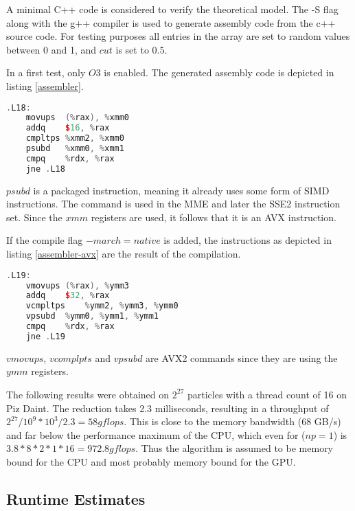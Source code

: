 \documentclass[]{article}
\begin{document}
A minimal C++ code is considered to verify the theoretical model. The -S flag along with the g++ compiler is used to generate assembly code from the c++ source code. For testing purposes all entries in the array are set to random values between 0 and 1, and $cut$ is set to 0.5.

In a first test, only $O3$ is enabled. The generated assembly code is depicted in listing \ref{assembler}.

\begin{lstlisting}[language=c++, caption=Reduction Assembler Code without AVX, label=assembler]
.L18:
	movups	(%rax), %xmm0
	addq	$16, %rax
	cmpltps	%xmm2, %xmm0
	psubd	%xmm0, %xmm1
	cmpq	%rdx, %rax
	jne	.L18

\end{lstlisting}

$psubd$ is a packaged instruction, meaning it already uses some form of SIMD instructions. The command is used in the MME and later the SSE2 instruction set. Since the $xmm$ registers are used, it follows that it is an AVX instruction.

If the compile flag $-march=native$ is added, the instructions as depicted in listing \ref{assembler-avx} are the result of the compilation.

\begin{lstlisting}[language=c++, caption=Reduction Assembler Code with AVX2, label=assembler-avx]
.L19:
	vmovups	(%rax), %ymm3
	addq	$32, %rax
	vcmpltps	%ymm2, %ymm3, %ymm0
	vpsubd	%ymm0, %ymm1, %ymm1
	cmpq	%rdx, %rax
	jne	.L19	

\end{lstlisting}

$vmovups$, $vcomplpts$ and $vpsubd$ are AVX2 commands since they are using the $ymm$ registers.

The following results were obtained on $2^{27}$ particles with a thread count of 16 on Piz Daint. The reduction takes 2.3 milliseconds, resulting in a throughput of $2^{27} / 10^{9} * 10^3 / 2.3 = 58 gflops$. This is close to the memory bandwidth (68 GB/s) and far below the performance maximum of the CPU, which even for ($np = 1$) is $3.8 * 8 * 2 * 1 * 16 = 972.8 gflops$. Thus the algorithm is assumed to be memory bound for the CPU and most probably memory bound for the GPU. 


\subsection{Runtime Estimates}
\end{document}
